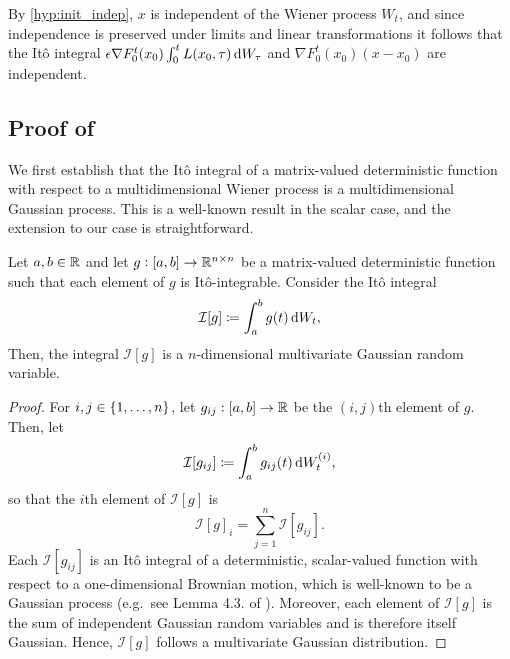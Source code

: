 By \ref{hyp:init_indep}, \(x\) is independent of the Wiener process \(W_t\), and since independence is preserved under limits and linear transformations it follows that the It\^o integral \(\epsilon \nabla F_0^t\!\left(x_0\right)\int_0^t{L\!\left(x_0, \tau\right)\dif W_\tau}\) and \(\nabla F_0^t\!\left(x_0\right)\left(x - x_0\right)\) are independent.


\subsection{Proof of }\label{app:limit_moments_proof}
We first establish that the It\^o integral of a matrix-valued deterministic function with respect to a multidimensional Wiener process is a multidimensional Gaussian process.
This is a well-known result in the scalar case, and the extension to our case is straightforward.
\begin{lemma}\label{lem:det_gauss}
	Let \(a,b \in \mathbb{R}\) and let \(g: [a,b] \to \mathbb{R}^{n\times n}\) be a matrix-valued deterministic function such that each element of \(g\) is It\^o-integrable.
	Consider the It\^o integral
	\[
		\mathcal{I}[g] \coloneqq \int_{a}^b{g(t)\dif W_t},
	\]
	Then, the integral \(\mathcal{I}[g]\) is a \(n\)-dimensional multivariate Gaussian random variable.
\end{lemma}
\begin{proof}
	For \(i,j \in \set{1,\hdots,n}\), let \(g_{ij}: [a,b] \to \mathbb{R}\) be the \((i,j)\)th element of \(g\).
	Then, let
	\[
		\mathcal{I}[g_{ij}] \coloneqq \int_a^b{g_{ij}(t)\dif W_t^{(i)}},
	\]
	so that the \(i\)th element of \(\mathcal{I}[g]\) is
	\[
		\mathcal{I}[g]_i = \sum_{j = 1}^n{\mathcal{I}\left[g_{ij}\right]}.
	\]
	Each \(\mathcal{I}[g_{ij}]\) is an It\^o integral of a deterministic, scalar-valued function with respect to a one-dimensional Brownian motion, which is well-known to be a Gaussian process (e.g.\ see Lemma 4.3. of \citet{Applebaum_2004_LevyProcessesStochastic}).
	Moreover, each element of \(\mathcal{I}[g]\) is the sum of independent Gaussian random variables and is therefore itself Gaussian.
	Hence, \(\mathcal{I}[g]\) follows a multivariate Gaussian distribution.
\end{proof}

